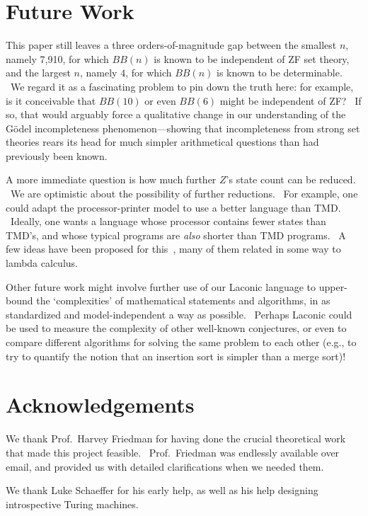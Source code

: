 \documentclass[11pt]{article}
\newcommand{\statenumcomma}{7,910, }
\begin{document}
\section{Future Work}

This paper still leaves a three orders-of-magnitude gap between the smallest $n$, namely \statenumcomma for which $BB(n)$ is known to be independent of ZF set theory, and the largest $n$, namely $4$, for which $BB(n)$ is known to be determinable. \ We regard it as a fascinating problem to pin down the truth here: for example, is it conceivable that $BB(10)$ or even $BB(6)$ might be independent of ZF? \ If so, that would arguably force a qualitative change in our understanding of the G\"{o}del incompleteness phenomenon---showing that incompleteness from strong set theories rears its head for much simpler arithmetical questions than had previously been known.

A more immediate question is how much further $Z$'s state count can be reduced. \ We are optimistic about the possibility of further reductions. \ For example, one could adapt the processor-printer model to use a better language than TMD. \ Ideally, one wants a language whose processor contains fewer states than TMD's, and whose typical programs are \emph{also} shorter than TMD programs. \ A few ideas have been proposed for this~\cite{comments}, many of them related in some way to lambda calculus.

Other future work might involve further use of our Laconic language to upper-bound the `complexities' of mathematical statements and algorithms, in as standardized and model-independent a way as possible. \ Perhaps Laconic could be used to measure the complexity of other well-known conjectures, or even to compare different algorithms for solving the same problem to each other (e.g., to try to quantify the notion that an insertion sort is simpler than a merge sort)!

\section{Acknowledgements}

We thank Prof.\ Harvey Friedman for having done the crucial theoretical work that made this project feasible. \ Prof.\ Friedman was endlessly available over email, and provided us with detailed clarifications when we needed them.

We thank Luke Schaeffer for his early help, as well as his help designing introspective Turing machines.
\end{document}
